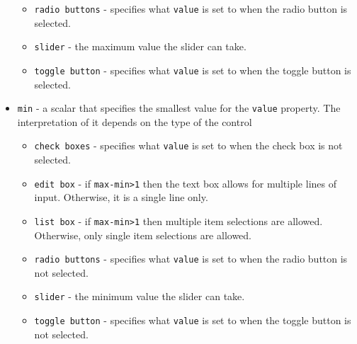 \begin{itemize}
\begin{itemize}
\item  \verb|radio buttons| - specifies what \verb|value| is set to when the
radio button is selected.

\item  \verb|slider| - the maximum value the slider can take.

\item  \verb|toggle button| - specifies what \verb|value| is set to when 
the toggle button is selected.

\end{itemize}
\item \verb|min| - a scalar that specifies the smallest value for the
\verb|value| property.  The interpretation of it depends on the type
of the control
\begin{itemize}
\item  \verb|check boxes| - specifies what \verb|value| is set to when the
check box is not selected.

\item  \verb|edit box| - if \verb|max-min>1| then the text box allows for
multiple lines of input.  Otherwise, it is a single line only.

\item  \verb|list box| - if \verb|max-min>1| then multiple item selections
are allowed.  Otherwise, only single item selections are allowed.

\item  \verb|radio buttons| - specifies what \verb|value| is set to when the
radio button is not selected.

\item  \verb|slider| - the minimum value the slider can take.

\item  \verb|toggle button| - specifies what \verb|value| is set to when 
the toggle button is not selected.


\end{itemize}
\end{itemize}

